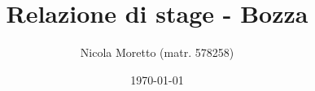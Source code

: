 \documentclass[11pt,a4paper,headsepline,hidelinks]{scrreprt} %
\begin{document}
  \title{Relazione di stage - Bozza}
	\subject{Analisi e progettazione di un'interfaccia grafica per la consultazione dei contenuti informativi in una piattaforma web tematica}
  \author{Nicola Moretto (matr. 578258)}
  \date{\today}

  \maketitle

	\tableofcontents

	\listoffigures
	\begingroup
	\let\clearpage\relax
	\listoftables
	\endgroup

	
	
	
	
	

	\appendix
	
	
\end{document}
